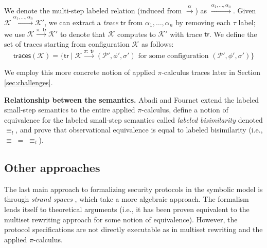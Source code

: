 \documentclass{article}
\theoremstyle{definition}
\begin{document}
We denote the multi-step labeled relation (induced from $\xrightarrow{\alpha}$) as $\xrightarrow{\alpha_1,\dots,\alpha_n}$. Given $\mathcal{K}\xrightarrow{\alpha_1,\dots,\alpha_n}\mathcal{K}'$, we can extract 
a \emph{trace} $\mathsf{tr}$ from $\alpha_1, \dots, \alpha_n$ by removing each $\tau$ label; we use $\mathcal{K}\xrightarrow{\pi:\; \mathsf{tr}} \mathcal{K}'$ to denote that $\mathcal{K}$ computes to $\mathcal{K}'$ with trace $\mathsf{tr}$.
We define the set of traces starting from configuration $\mathcal{K}$ as follows: 
$$\mathsf{traces}(\mathcal{K}) = \{\mathsf{tr} \mid \mathcal{K} \xrightarrow{\pi:\; \mathsf{tr}} (\mathcal{P}', \phi', \sigma')\text{ for some configuration } (\mathcal{P}', \phi', \sigma')\}$$

We employ this more concrete notion of applied $\pi$-calculus traces later in Section \ref{sec:challenges}.

\textbf{Relationship between the semantics.} Abadi and Fournet \cite{apc} extend the labeled small-step semantics to the entire applied $\pi$-calculus, define a notion of equivalence for the labeled small-step semantics called \emph{labeled bisimilarity} denoted $\equiv_l$, and prove that observational equivalence is equal to labeled bisimilarity (i.e., $\equiv \; = \; \equiv_l$).



\subsection{Other approaches}
The last main approach to formalizing security protocols in the symbolic model is through \emph{strand spaces} \cite{strand_spaces}, 
which take a more algebraic approach. The formalism lends itself to theoretical arguments 
(i.e., it has been proven equivalent to the multiset rewriting approach \cite{strand_spaces_msr} 
for some notion of equivalence). 
However, the protocol specifications are not directly executable as in multiset rewriting and the applied $\pi$-calculus.
\end{document}
